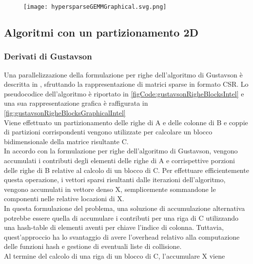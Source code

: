 \begin{figure}[h]
  \centering \texttt{[image: hypersparseGEMMGraphical.svg.png]}
  \caption[Rappresentazione grafica del prodotto cartesiano 
   a supporto di hypersparseGEMM ] \decoRule \label{fig:hypersparseGEMMGraphical}
\end{figure}


\subsection{Algoritmi con un partizionamento 2D}

\subsubsection{Derivati di Gustavson} \label{ssec:gustavsonDerivate}
Una parallelizzazione della formulazione per righe dell'algoritmo di Gustavson è
descritta in \parencite{intelSpGEMMDenseAccumulator}, sfruttando la
rappresentazione di matrici sparse in formato CSR.  \label{ssec:intelSpGEMMDenseAccumulator}
Lo pseudocodice dell'algoritmo è riportato in \ref{figCode:gustavsonRigheBlocksIntel}
e una sua rappresentazione grafica è raffigurata in
\ref{fig:gustavsonRigheBlocksGraphicalIntel}\\
Viene effettuato un partizionamento delle righe di A e delle colonne di B e 
coppie di partizioni corrispondenti vengono utilizzate per calcolare un
blocco bidimensionale della matrice risultante C.\\
In accordo con la formulazione per righe dell'algoritmo di Gustavson, vengono
accumulati i contributi degli elementi \nnz delle righe di A e corrispettive porzioni
delle righe di B relative al calcolo di un blocco di C. 
Per effettuare efficientemente questa operazione, i vettori sparsi risultanti
dalle iterazioni dell'algoritmo, vengono accumulati in vettore denso X, 
semplicemente sommandone le componenti \nnz nelle relative locazioni di X.\\
In questa formulazione del problema, una soluzione di accumulazione 
alternativa potrebbe essere quella di accumulare i contributi per una riga di C 
utilizzando una hash-table di elementi aventi per chiave l'indice di colonna. 
Tuttavia, quest'approccio ha lo svantaggio di avere l'overhead relativo alla 
computazione delle funzioni hash e gestione di eventuali liste di collisione.\\
Al termine del calcolo di una riga di un blocco di C, l'accumulare X viene
